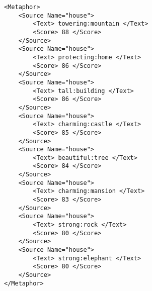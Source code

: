 \lstset{language=XML}
\begin{lstlisting}[caption= Ejemplo formatos XML Metaphor Magnet, label={lst:xmlmetaphormagnet}, frame=single]
<Metaphor>
	<Source Name="house">
		<Text> towering:mountain </Text>
		<Score> 88 </Score>
	</Source>
	<Source Name="house">
		<Text> protecting:home </Text>
		<Score> 86 </Score>
	</Source>
	<Source Name="house">
		<Text> tall:building </Text>
		<Score> 86 </Score>
	</Source>
	<Source Name="house">
		<Text> charming:castle </Text>
		<Score> 85 </Score>
	</Source>
	<Source Name="house">
		<Text> beautiful:tree </Text>
		<Score> 84 </Score>
	</Source>
	<Source Name="house">
		<Text> charming:mansion </Text>
		<Score> 83 </Score>
	</Source>
	<Source Name="house">
		<Text> strong:rock </Text>
		<Score> 80 </Score>
	</Source>
	<Source Name="house">
		<Text> strong:elephant </Text>
		<Score> 80 </Score>
	</Source>
</Metaphor>
\end{lstlisting}




